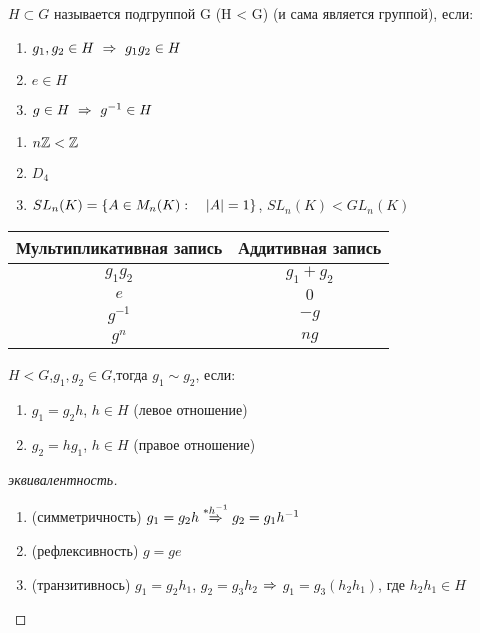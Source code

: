 \documentclass[main]{subfiles}
\begin{document}
  \begin{definition}
      $H \subset G$ называется подгруппой G (H < G) (и сама является группой), если:
      \begin{enumerate}
      	\item $g_1,g_2 \in H \ \Rightarrow\  g_1 g_2 \in H$
      	\item $e \in H$
      	\item $g \in H \ \Rightarrow\  g^{-1} \in H$
  	\end{enumerate}
  \end{definition}

  \begin{examples}
      \begin{enumerate}
      	\item $n\mathbb{Z} < \mathbb{Z}$
      	\item $D_4$
      	\item $SL_n(K)=\{A \in M_n(K): \quad |A|=1\}$, $SL_n(K)<GL_n(K)$
  	\end{enumerate}
  \end{examples}

  \begin{tabular} {c|c}
  	Мультипликативная запись & Аддитивная запись\\ \hline
  	$g_1 g_2$ & $g_1 + g_2$\\
  	$e$ & $0$\\
  	$g^{-1}$ & $-g$\\
      $g^n$ & $ng$
  \end{tabular}

  \begin{definition}
      $H<G$,\q $g_1,g_2 \in G$,\q тогда $g_1 \sim g_2$, если:
      \begin{enumerate}
      	\item $g_1=g_2 h$, $h \in H$ (левое отношение)
      	\item $g_2=h g_1$, $h \in H$ (правое отношение)
  	\end{enumerate}
  \end{definition}

  \begin{proof}[эквивалентность]
      \begin{enumerate}
      	\item (симметричность) $g_1=g_2 h \overset{*h^{-1}}{\Rightarrow} g_2 = g_1 h^{-1}$
      	\item (рефлексивность) $g=ge$
      	\item (транзитивнось) $g_1=g_2 h_1$, $g_2 = g_3 h_2$ $\Rightarrow$ $g_1=g_3(h_2 h_1)$, где $h_2 h_1 \in H$
  	\end{enumerate}
  \end{proof}
\end{document}
